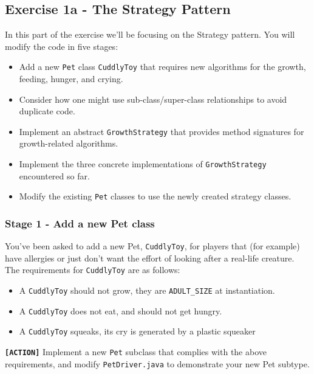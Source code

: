 \documentclass[
]{book}
\providecommand{\tightlist}{%
  \setlength{\itemsep}{0pt}\setlength{\parskip}{0pt}}
\begin{document}
\hypertarget{strategy}{%
\subsection{Exercise 1a - The Strategy Pattern}\label{strategy}}

In this part of the exercise we'll be focusing on the Strategy pattern. You will modify the code in five stages:

\begin{itemize}
\tightlist
\item
  Add a new \texttt{Pet} class \texttt{CuddlyToy} that requires new algorithms for the growth, feeding, hunger, and crying.
\item
  Consider how one might use sub-class/super-class relationships to avoid duplicate code.
\item
  Implement an abstract \texttt{GrowthStrategy} that provides method signatures for growth-related algorithms.
\item
  Implement the three concrete implementations of \texttt{GrowthStrategy} encountered so far.
\item
  Modify the existing \texttt{Pet} classes to use the newly created strategy classes.
\end{itemize}

\hypertarget{pet}{%
\subsubsection{Stage 1 - Add a new Pet class}\label{pet}}

You've been asked to add a new Pet, \texttt{CuddlyToy}, for players that (for example) have allergies or just don't want the effort of looking after a real-life creature. The requirements for \texttt{CuddlyToy} are as follows:

\begin{itemize}
\tightlist
\item
  A \texttt{CuddlyToy} should not grow, they are \texttt{ADULT\_SIZE} at instantiation.
\item
  A \texttt{CuddlyToy} does not eat, and should not get hungry.
\item
  A \texttt{CuddlyToy} squeaks, its cry is generated by a plastic squeaker
\end{itemize}

\textbf{\texttt{{[}ACTION{]}}} Implement a new \texttt{Pet} subclass that complies with the above requirements, and modify \texttt{PetDriver.java} to demonstrate your new Pet subtype.
\end{document}
